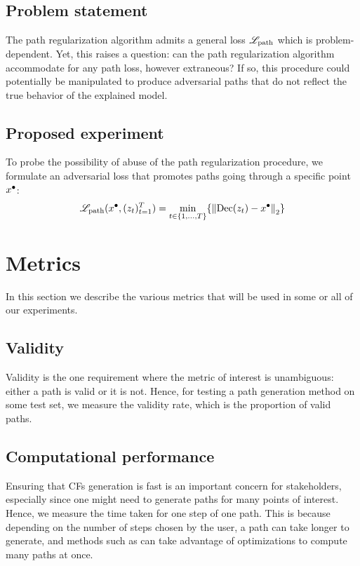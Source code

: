 \documentclass[../main.tex]{subfiles}
\begin{document}
\subsection{Problem statement}

The path regularization algorithm admits a general loss $\mathscr{L}_\text{path}$ which is problem-dependent.
Yet, this raises a question: can the path regularization algorithm accommodate for any path loss, however extraneous?
If so, this procedure could potentially be manipulated to produce adversarial paths that do not reflect the true behavior of the explained model.

\subsection{Proposed experiment}

To probe the possibility of abuse of the path regularization procedure, we formulate an adversarial loss that promotes paths going through a specific point $x^\bullet$:
\begin{align}
    \mathscr{L}_\text{path}(x^\bullet, (z_t)_{t=1}^T) = \min_{t \in \{1, \ldots, T\}} \{ \left\lVert\operatorname{Dec}(z_t) - x^\bullet\right\rVert_2 \}
\end{align}

\section{Metrics}

In this section we describe the various metrics that will be used in some or all of our experiments.

\subsection{Validity}

Validity is the one requirement where the metric of interest is unambiguous: either a path is valid or it is not.
Hence, for testing a path generation method on some test set, we measure the validity rate, which is the proportion of valid paths.

\subsection{Computational performance}

Ensuring that CFs generation is fast is an important concern for stakeholders, especially since one might need to generate paths for many points of interest.
Hence, we measure the time taken for one step of one path.
This is because depending on the number of steps chosen by the user, a path can take longer to generate, and methods such as \ls{} can take advantage of optimizations to compute many paths at once.
\end{document}

